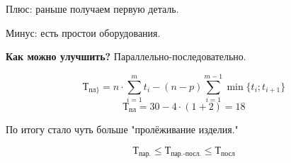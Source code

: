 Плюс: раньше получаем первую деталь.

Минус: есть простои оборудования.

\noindent\textbf{Как можно улучшить?} Параллельно-последовательно.

\[
\text{Т}_{\text{пл}\}} = n \cdot \sum_{i=1}^{m} t_i - (n - p) \sum_{i=1}^{m-1} \min \{t_i; t_{i+1}\}
\]
\[
\text{Т}_{\text{пл}} = 30 - 4 \cdot (1 + 2) = 18
\]

По итогу стало чуть больше "пролёживание изделия."\,

\[
\text{Т}_{\text{пар.}} \le \text{Т}_{\text{пар.-посл.}} \le \text{Т}_{\text{посл}}
\]



\newpage

\tableofcontents


